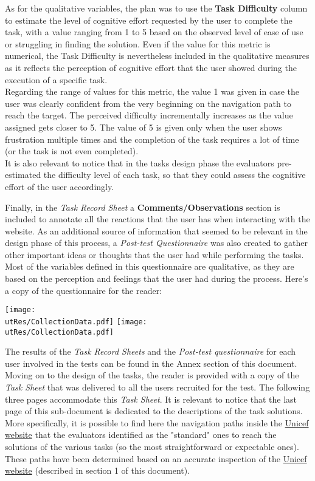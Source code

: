 As for the qualitative variables, the plan was to use the \textbf{Task Difficulty} column to estimate the level of cognitive effort requested by the user to complete the task, with a value ranging from 1 to 5 based on the observed level of ease of use or struggling in finding the solution. Even if the value for this metric is numerical, the Task Difficulty is nevertheless included in the qualitative measures as it reflects the perception of cognitive effort that the user showed during the execution of a specific task.\\ Regarding the range of values for this metric, the value 1 was given in case the user was clearly confident from the very beginning on the navigation path to reach the target. The perceived difficulty incrementally increases as the value assigned gets closer to 5. The value of 5 is given only when the user shows frustration multiple times and the completion of the task requires a lot of time (or the task is not even completed).\\
It is also relevant to notice that in the tasks design phase the evaluators pre-estimated the difficulty level of each task, so that they could assess the cognitive effort of the user accordingly.

Finally, in the \textit{Task Record Sheet} a \textbf{Comments/Observations} section is included to annotate all the reactions that the user has when interacting with the website.
As an additional source of information that seemed to be relevant in the design phase of this process, a \textit{Post-test Questionnaire} was also created to gather other important ideas or thoughts that the user had while performing the tasks. Most of the variables defined in this questionnaire are qualitative, as they are based on the perception and feelings that the user had during the process.
Here's a copy of the questionnaire for the reader:

\begin{center}
	\texttt{[image: \\utRes/CollectionData.pdf]}
	\texttt{[image: \\utRes/CollectionData.pdf]}
\end{center}

The results of the \textit{Task Record Sheets} and the \textit{Post-test questionnaire} for each user involved in the tests can be found in the Annex section of this document.\\
 
 
Moving on to the design of the tasks, the reader is provided with a copy of the \textit{Task Sheet} that was delivered to all the users recruited for the test. The following three pages accommodate this \textit{Task Sheet}. It is relevant to notice that the last page of this sub-document is dedicated to the descriptions of the task solutions. More specifically, it is possible to find here the navigation paths inside the \href{https://www.unicef.org/}{Unicef website} that the evaluators identified as the "standard" ones to reach the solutions of the various tasks (so the most straightforward or expectable ones). These paths have been determined based on an accurate inspection of the \href{https://www.unicef.org/}{Unicef website} (described in section 1 of this document). 

